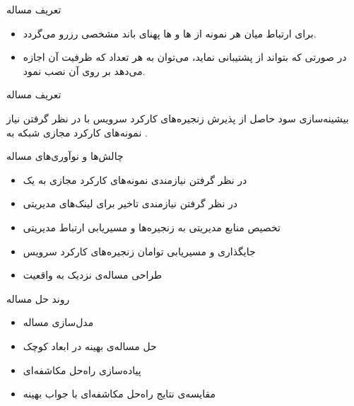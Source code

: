 \documentclass{beamer}
\makeatletter
\newcommand{\RTList}{\raggedleft\rightskip\@totalleftmargin}
\makeatother
\begin{document}
\begin{persian}
\begin{frame}{تعریف مساله}
\begin{itemize}
        \item برای ارتباط میان هر نمونه از ها و ها پهنای باند مشخصی رزرو می‌گردد.
        \item در صورتی که  بتواند از  پشتیبانی نماید،
        می‌توان به هر تعداد که ظرفیت آن اجازه می‌دهد بر روی آن  نصب نمود.
    \end{itemize}
\end{frame}
\begin{frame}{تعریف مساله}
    \begin{block}{}
        بیشینه‌سازی سود حاصل از پذیرش زنجیره‌های کارکرد سرویس با در نظر گرفتن نیاز نمونه‌های کارکرد
        مجازی شبکه به .
    \end{block}
\end{frame}
\begin{frame}{چالش‌ها و نوآوری‌های مساله}
    \begin{itemize}\RTList{}
        \justifying
        \item در نظر گرفتن نیازمندی نمونه‌های کارکرد مجازی به یک 
        \item در نظر گرفتن نیازمندی تاخیر برای لینک‌های مدیریتی
        \item تخصیص منابع مدیریتی به زنجیره‌ها و مسیریابی ارتباط مدیریتی
        \item جایگذاری و مسیریابی توامان زنجیره‌های کارکرد سرویس
        \item طراحی مساله‌ی نزدیک به واقعیت
    \end{itemize}
\end{frame}
\begin{frame}{روند حل مساله}
    \begin{itemize}\RTList{}
        \justifying
        \item مدل‌سازی مساله
        \item حل مساله‌ی بهینه در ابعاد کوچک
        \item پیاده‌سازی راه‌حل مکاشفه‌ای
        \item مقایسه‌ی نتایج راه‌حل مکاشفه‌ای با جواب بهینه
    \end{itemize}
\end{frame}
\begin{frame}{}

\end{frame}
\end{persian}
\end{document}
